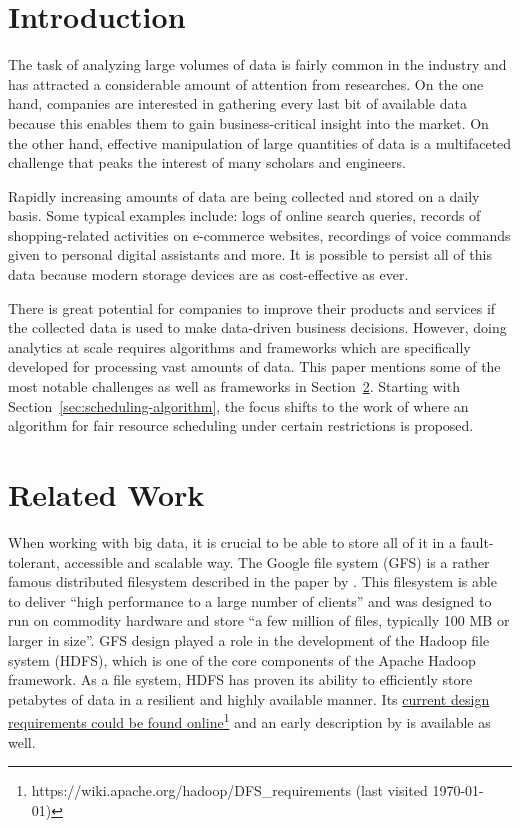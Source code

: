 
\theoremstyle{definition}
\newtheorem{definition}{Definition}[section]

\theoremstyle{definition}
\newtheorem{optimization}{Optimization Problem}

\section{Introduction}

The task of analyzing large volumes of data is fairly common in the industry and has attracted a considerable amount of attention from researches. On the one hand, companies are interested in gathering every last bit of available data because this enables them to gain business-critical insight into the market. On the other hand, effective manipulation of large quantities of data is a multifaceted challenge that peaks the interest of many scholars and engineers.

Rapidly increasing amounts of data are being collected and stored on a daily basis. Some typical examples include: logs of online search queries, records of shopping-related activities on e-commerce websites, recordings of voice commands given to personal digital assistants and more. It is possible to persist all of this data because modern storage devices are as cost-effective as ever.

There is great potential for companies to improve their products and services if the collected data is used to make data-driven business decisions. However, doing analytics at scale requires algorithms and frameworks which are specifically developed for processing vast amounts of data. This paper mentions some of the most notable challenges as well as frameworks in Section~\ref{sec:related-work}. Starting with Section~\ref{sec:scheduling-algorithm}, the focus shifts to the work of \citet{Chen2017} where an algorithm for fair resource scheduling under certain restrictions is proposed.

\section{Related Work}
\label{sec:related-work}

When working with big data, it is crucial to be able to store all of it in a fault-tolerant, accessible and scalable way. The Google file system (GFS) is a rather famous distributed filesystem described in the paper by \citet{2003-ghemawat-gfs}. This filesystem is able to deliver ``high performance to a large number of clients'' and was designed to run on commodity hardware and store ``a few million of files, typically 100 MB or larger in size''. GFS design played a role in the development of the Hadoop file system (HDFS), which is one of the core components of the Apache Hadoop framework. As a file system, HDFS has proven its ability to efficiently store petabytes of data in a resilient and highly available manner. Its \href{https://wiki.apache.org/hadoop/DFS_requirements}{current design requirements could be found online\footnote{\url{https://wiki.apache.org/hadoop/DFS_requirements} (last visited \today)}} and an early description by \citet{2010-shvachko-hdfs} is available as well.

